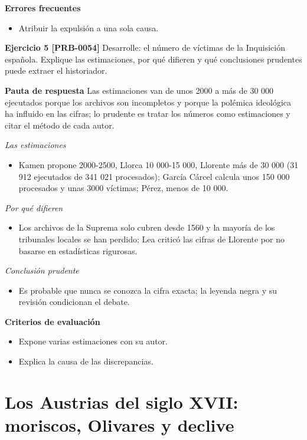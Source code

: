 \documentclass{book}
\begin{document}
\noindent\textbf{Errores frecuentes}
\begin{itemize}
\item Atribuir la expulsión a una sola causa.
\end{itemize}

\noindent\textbf{Ejercicio 5 [PRB-0054]}
Desarrolle: el número de víctimas de la Inquisición española. Explique las estimaciones, por qué difieren y qué conclusiones prudentes puede extraer el historiador.


\noindent\textbf{Pauta de respuesta}
Las estimaciones van de unos 2000 a más de 30 000 ejecutados porque los archivos son incompletos y porque la polémica ideológica ha influido en las cifras; lo prudente es tratar los números como estimaciones y citar el método de cada autor.


\noindent\textit{Las estimaciones}
\begin{itemize}
\item Kamen propone 2000-2500, Llorca 10 000-15 000, Llorente más de 30 000 (31 912 ejecutados de 341 021 procesados); García Cárcel calcula unos 150 000 procesados y unas 3000 víctimas; Pérez, menos de 10 000.
\end{itemize}

\noindent\textit{Por qué difieren}
\begin{itemize}
\item Los archivos de la Suprema solo cubren desde 1560 y la mayoría de los tribunales locales se han perdido; Lea criticó las cifras de Llorente por no basarse en estadísticas rigurosas.
\end{itemize}

\noindent\textit{Conclusión prudente}
\begin{itemize}
\item Es probable que nunca se conozca la cifra exacta; la leyenda negra y su revisión condicionan el debate.
\end{itemize}

\noindent\textbf{Criterios de evaluación}
\begin{itemize}
\item Expone varias estimaciones con su autor.
\item Explica la causa de las discrepancias.
\end{itemize}

\section{Los Austrias del siglo XVII: moriscos, Olivares y declive}
\end{document}
